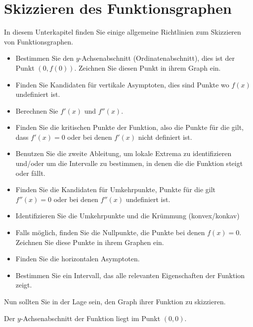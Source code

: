 











\section{Skizzieren des Funktionsgraphen} 

In diesem Unterkapitel finden Sie einige allgemeine Richtlinien zum Skizzieren von Funktionsgraphen.


\begin{procedureForPlotting}\hfil
\begin{itemize}
\item Bestimmen Sie den $y$-Achsenabschnitt (Ordinatenabschnitt), dies ist der Punkt $(0,f(0))$. Zeichnen Sie diesen Punkt in ihrem Graph ein.
\item Finden Sie Kandidaten für vertikale Asymptoten, dies sind Punkte wo
  $f(x)$ undefiniert ist.
\item Berechnen Sie $f'(x)$ und $f''(x)$.
\item Finden Sie die kritischen Punkte der Funktion, also die Punkte für die gilt, dass  $f'(x) = 0$ oder bei denen $f'(x)$ nicht definiert ist.
\item Benutzen Sie die zweite Ableitung, um lokale Extrema zu identifizieren und/oder um die Intervalle zu bestimmen, in denen die die Funktion steigt oder fällt.
\item Finden Sie die Kandidaten für Umkehrpunkte, Punkte für die gilt $f''(x) = 0$ oder bei denen $f''(x)$ undefiniert ist.
\item Identifizieren Sie die Umkehrpunkte und die Krümmung (konvex/konkav)
\item Falls möglich, finden Sie die Nullpunkte, die Punkte bei denen $f(x) =0$. Zeichnen Sie diese Punkte in ihrem Graphen ein.
\item Finden Sie die horizontalen Asymptoten.
\item Bestimmen Sie ein Intervall, das alle relevanten Eigenschaften der Funktion zeigt.
\end{itemize}
Nun sollten Sie in der Lage sein, den Graph ihrer Funktion zu skizzieren.
\end{procedureForPlotting}
\begin{marginfigure}[-2.5in]
\caption{Der $y$-Achsenabschnitt der Funktion liegt im Punkt $(0,0)$.}
\label{figure:CS1}
\end{marginfigure}

